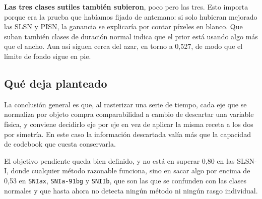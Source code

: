 \documentclass[11pt,a4paper]{article}
\begin{document}
\textbf{Las tres clases sutiles también subieron}, poco pero las tres. Esto importa porque
era la prueba que habíamos fijado de antemano: si solo hubieran mejorado las SLSN y PISN, la
ganancia se explicaría por contar píxeles en blanco. Que suban también clases de duración
normal indica que el prior está usando algo más que el ancho. Aun así siguen cerca del azar,
en torno a 0,527, de modo que el límite de fondo sigue en pie.

\subsection*{Qué deja planteado}

La conclusión general es que, al rasterizar una serie de tiempo, cada eje que se normaliza
por objeto compra comparabilidad a cambio de descartar una variable física, y conviene
decidirlo eje por eje en vez de aplicar la misma receta a los dos por simetría. En este caso
la información descartada valía más que la capacidad de codebook que cuesta conservarla.

El objetivo pendiente queda bien definido, y no está en superar 0,80 en las SLSN-I, donde
cualquier método razonable funciona, sino en sacar algo por encima de 0,53 en
\texttt{SNIax}, \texttt{SNIa-91bg} y \texttt{SNIIb}, que son las que se confunden con las
clases normales y que hasta ahora no detecta ningún método ni ningún rasgo individual.
\end{document}
